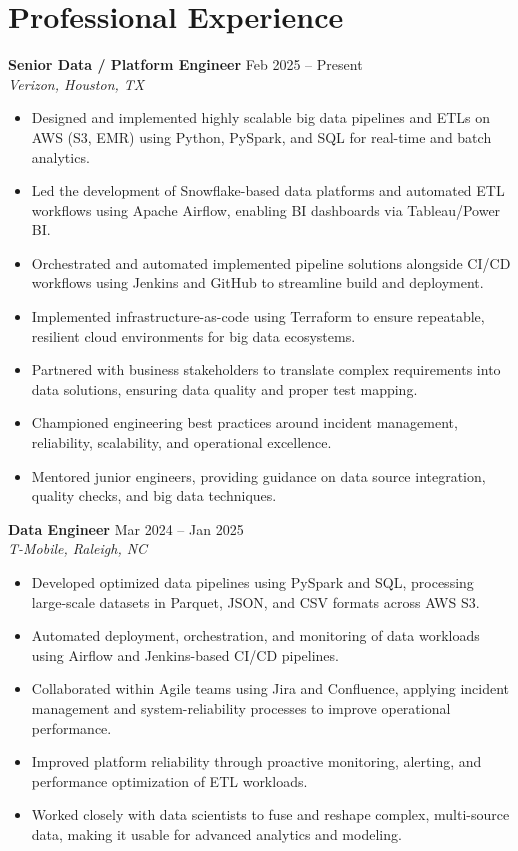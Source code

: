 \documentclass[10pt]{article}
\begin{document}
\section*{Professional Experience}

\textbf{Senior Data / Platform Engineer} \hfill Feb 2025 -- Present \\ %
\textit{Verizon, Houston, TX}
\begin{itemize}[leftmargin=*, itemsep=3pt]
    \item Designed and implemented highly scalable big data pipelines and ETLs on AWS (S3, EMR) using Python, PySpark, and SQL for real-time and batch analytics. %
    \item Led the development of Snowflake-based data platforms and automated ETL workflows using Apache Airflow, enabling BI dashboards via Tableau/Power BI. %
    \item Orchestrated and automated implemented pipeline solutions alongside CI/CD workflows using Jenkins and GitHub to streamline build and deployment. %
    \item Implemented infrastructure-as-code using Terraform to ensure repeatable, resilient cloud environments for big data ecosystems. %
    \item Partnered with business stakeholders to translate complex requirements into data solutions, ensuring data quality and proper test mapping. %
    \item Championed engineering best practices around incident management, reliability, scalability, and operational excellence. %
    \item Mentored junior engineers, providing guidance on data source integration, quality checks, and big data techniques. %
\end{itemize}

\textbf{Data Engineer} \hfill Mar 2024 -- Jan 2025 \\ %
\textit{T-Mobile, Raleigh, NC}
\begin{itemize}[leftmargin=*, itemsep=3pt]
    \item Developed optimized data pipelines using PySpark and SQL, processing large-scale datasets in Parquet, JSON, and CSV formats across AWS S3. %
    \item Automated deployment, orchestration, and monitoring of data workloads using Airflow and Jenkins-based CI/CD pipelines. %
    \item Collaborated within Agile teams using Jira and Confluence, applying incident management and system-reliability processes to improve operational performance. %
    \item Improved platform reliability through proactive monitoring, alerting, and performance optimization of ETL workloads. %
    \item Worked closely with data scientists to fuse and reshape complex, multi-source data, making it usable for advanced analytics and modeling. %
\end{itemize}
\end{document}
